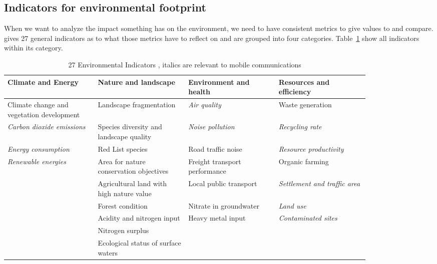 \documentclass[11pt,a4paper]{article}
\begin{document}
\subsection{Indicators for environmental footprint}\label{subsec:indicators}

When we want to analyze the impact something has on the environment, we need to have consistent metrics to give values to and compare.
\citep{Umweltindikatoren} gives 27 general indicators as to what those metrics have to reflect on and are grouped into four categories.
Table~\ref{tab:indicators} show all indicators within its category.

\begin{table}[ht]
  \centering
  \begin{tabular}{p{0.21\linewidth}|p{0.21\linewidth}|p{0.21\linewidth}|p{0.21\linewidth}}
    \textbf{Climate and Energy} & \textbf{Nature and landscape} & \textbf{Environment and health} & \textbf{Resources and efficiency}\\
    \hline
    Climate change and vegetation development & Landscape fragmentation & \textit{Air quality} & Waste generation\\
    \hline
    \textit{Carbon dioxide emissions} & Species diversity and landscape quality & \textit{Noise pollution} & \textit{Recycling rate}\\
    \hline
    \textit{Energy consumption} & Red List species & Road traffic noise & \textit{Resource productivity}\\
    \hline
    \textit{Renewable energies} & Area for nature conservation objectives & Freight transport performance & Organic farming\\
    \hline
    & Agricultural land with high nature value & Local public transport & \textit{Settlement and traffic area}\\
    \hline
    & Forest condition & Nitrate in groundwater & \textit{Land use}\\
    \hline
    & Acidity and nitrogen input & Heavy metal input & \textit{Contaminated sites}\\
    \hline
    & Nitrogen surplus &\\
    \hline
    & Ecological status of surface waters &\\
  \end{tabular}
  \caption{27 Environmental Indicators \citep{Umweltindikatoren}, italics are relevant to mobile communications}
  \label{tab:indicators}
\end{table}
\end{document}
